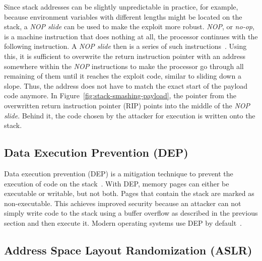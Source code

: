 

Since stack addresses can be slightly unpredictable in practice, for example, because environment variables with
different lengths might be located on the stack, a \textit{NOP slide} can be used to make the exploit more robust.
\textit{NOP}, or \textit{no-op}, is a machine instruction that does nothing at all, the processor continues with the
following instruction.
A \textit{NOP slide} then is a series of such instructions~\cite{vallentin2007}.
Using this, it is sufficient to overwrite the return instruction pointer with an address somewhere within the
\textit{NOP} instructions to make the processor go through all remaining of them until it reaches the exploit code,
similar to sliding down a slope.
Thus, the address does not have to match the exact start of the payload code anymore.
In Figure~\ref{fig:stack-smashing-payload}, the pointer from the overwritten return instruction pointer (\acrshort{RIP})
points into the middle of the \textit{NOP slide}.
Behind it, the code chosen by the attacker for execution is written onto the stack.



\subsection{Data Execution Prevention (DEP)}\label{subsec:background:exploit-techniques:dep}

Data execution prevention (\acrshort{DEP}) is a mitigation technique to prevent the execution of code on the
stack~\cite{gao2013}.
With \acrshort{DEP}, memory pages can either be executable or writable, but not both.
Pages that contain the stack are marked as non-executable.
This achieves improved security because an attacker can not simply write code to the stack using a buffer overflow as
described in the previous section and then execute it.
Modern operating systems use \acrshort{DEP} by default~\cite{davi2011}.



\subsection{Address Space Layout Randomization (ASLR)}\label{subsec:background:exploit-techniques:aslr}

